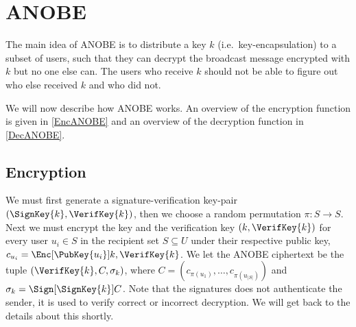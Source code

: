 \appendix
\section{\Acl{ANOBE}}\label{ANOBE}

The main idea of \ac{ANOBE} is to distribute a key \(k\) (i.e.\ 
key-encapsulation) to a subset of users, such that they can decrypt the 
broadcast message encrypted with \(k\) but no one else can.
The users who receive \(k\) should not be able to figure out who else received 
\(k\) and who did not.

We will now describe how \ac{ANOBE} works.
An overview of the encryption function is given in \cref{EncANOBE} and an 
overview of the decryption function in \cref{DecANOBE}.

\subsection{Encryption}

We must first generate a signature-verification key-pair \((\SignKey{k}, 
  \VerifKey{k})\), then we choose a random permutation \(\pi\colon S\to S\).
Next we must encrypt the key and the verification key \((k, \VerifKey{k})\) for 
every user \(u_i\in S\) in the recipient set \(S\subseteq U\) under their 
respective public key, \(c_{u_i} = \Enc[\PubKey{u_i}]{k, \VerifKey{k}}\).
We let the \ac{ANOBE} ciphertext be the tuple \((\VerifKey{k}, C, \sigma_k)\), 
where
\(C = ( c_{\pi(u_1)}, \ldots, c_{\pi(u_{|S|})})\) and
\(\sigma_k = \Sign[\SignKey{k}]{ C }\).
Note that the signatures does not authenticate the sender, it is used to verify 
correct or incorrect decryption.
We will get back to the details about this shortly.

